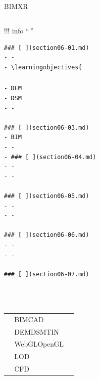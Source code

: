 \hypertarget{section}{%
\section{}\label{section}}


\hypertarget{section-1}{%
\subsection{}\label{section-1}}

BIMXR

\hypertarget{section-2}{%
\subsection{}\label{section-2}}

!!! info ``\,''

\begin{verbatim}
### [ ](section06-01.md)
- - 
- \learningobjectives{
\end{verbatim}

\hypertarget{section-3}{%
\subsubsection{\texorpdfstring{\href{section06-02.md}{}}{}}\label{section-3}}

\begin{verbatim}
- DEM
- DSM
- - 

### [ ](section06-03.md)
- BIM
- - 
- ### [ ](section06-04.md)
- - 
- - 

### [ ](section06-05.md)
- - 
- - 

### [ ](section06-06.md)
- - 
- - 

### [ ](section06-07.md)
- - -
- - 
\end{verbatim}

\hypertarget{section-4}{%
\subsection{}\label{section-4}}

\begin{longtable}[]{@{}lll@{}}
\toprule\noalign{}
\endhead
\bottomrule\noalign{}
\endlastfoot
& BIMCAD & \\
& DEMDSMTIN & \\
& WebGLOpenGL & \\
& LOD & \\
& CFD & \\
\end{longtable}


